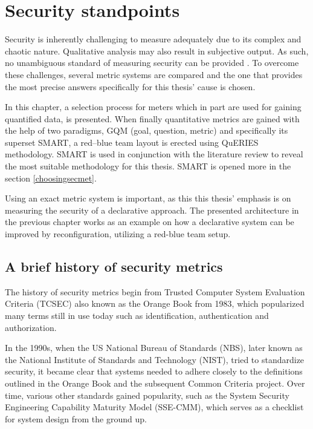 \chapter{Security standpoints} \label{securitystandpoints}

Security is inherently challenging to measure adequately due to its
complex and chaotic nature. Qualitative analysis may also result in
subjective output. As such, no unambiguous standard of measuring
security can be provided \cite{wang2005information}. To overcome these
challenges, several metric systems are compared and the one that
provides the most precise answers specifically for this thesis' cause
is chosen.

In this chapter, a selection process for meters which in part are used
for gaining quantified data, is presented.  When finally quantitative
metrics are gained with the help of two paradigms, GQM (goal, question, metric) and
specifically its superset SMART, a red–blue team layout is erected
using QuERIES methodology. SMART is used in conjunction with the
literature review to reveal the most suitable methodology for this
thesis. SMART is opened more in the section \ref{choosingsecmet}.

Using an exact metric system is important, as this this thesis'
emphasis is on measuring the security of a declarative approach. The
presented architecture in the previous chapter works as an example on
how a declarative system can be improved by reconfiguration, utilizing
a red-blue team setup.

\section{A brief history of security metrics}

The history of security metrics begin from Trusted Computer System
Evaluation Criteria (TCSEC) also known as the Orange Book from 1983,
which popularized many terms still in use today such as
identification, authentication and
authorization. \cite{bayuk2013measuring}

In the 1990s, when the US National Bureau of Standards (NBS), later
known as the National Institute of Standards and Technology (NIST),
tried to standardize security, it became clear that systems needed to
adhere closely to the definitions outlined in the Orange Book and the
subsequent Common Criteria project. Over time, various other standards
gained popularity, such as the System Security Engineering Capability
Maturity Model (SSE-CMM), which serves as a checklist for system
design from the ground up. \cite{bayuk2013measuring}

